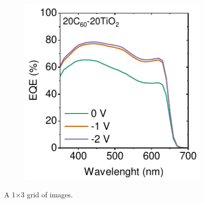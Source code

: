 \begin{figure}[htbp]
\begin{subfigure}{0.32\textwidth}
        \caption{}
        \label{}
    \end{subfigure}
    \hfill
    \begin{subfigure}{0.32\textwidth}
        \centering
        \includegraphics[width=\textwidth]{chapters/transport_layers/images/EQE_20_20.pdf}
        \caption{}
        \label{}
    \end{subfigure}
    
    \caption{A 1×3 grid of images.}
    \label{}
\end{figure}


